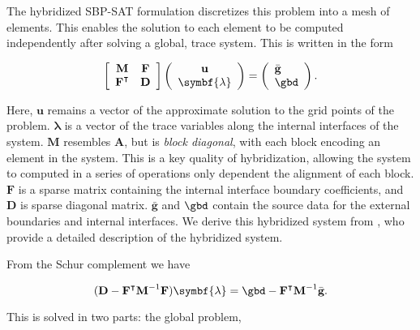 
%
%
%
The hybridized SBP-SAT formulation discretizes this problem into a mesh of elements. This enables the solution to each element to be computed independently after solving a global, trace system. 
This is written in the form

%
%
%
\begin{equation}
    \left[\begin{array}{cc}
        \textbf{M}             & \textbf{F} \\
        \textbf{F}^{\intercal} & \textbf{D}
    \end{array}\right] 
    \left(\begin{array}{c}
        \textbf{u} \\
        \symbf{\lambda}
    \end{array}\right) = 
    \left(\begin{array}{l}
        \bar{\textbf{g}} \\
        \gbd
    \end{array}\right).
    \label{eqn:hybrid_system}
\end{equation}

%
%
%
\noindent
Here, $\textbf{u}$ remains a vector of the approximate solution to the grid points of the problem. 
$\symbf{\lambda}$ is a vector of the trace variables along the internal interfaces of the system. 
$\textbf{M}$ resembles $\textbf{A}$, but is \emph{block diagonal}, with each block encoding an element in the system. 
This is a key quality of hybridization, allowing the system to computed in a series of operations only dependent the alignment of each block. 
$\textbf{F}$ is a sparse matrix containing the internal interface boundary coefficients, and $\textbf{D}$ is sparse diagonal matrix.
$\bar{\textbf{g}}$ and $\gbd$ contain the source data for the external boundaries and internal interfaces. 
We derive this hybridized system from \citet{kozdon2021hybridized}, who provide a detailed description of the hybridized system.

%
%
%
From the Schur complement we have 

\begin{equation}
(\textbf{D} - \textbf{F}^{\intercal} \textbf{M}^{-1} \textbf{F}) \symbf{\lambda} = \gbd - \textbf{F}^{\intercal} \textbf{M}^{-1} \bar{\textbf{g}}.
\end{equation}

%
%
%
\noindent 
This is solved in two parts: the global problem,

